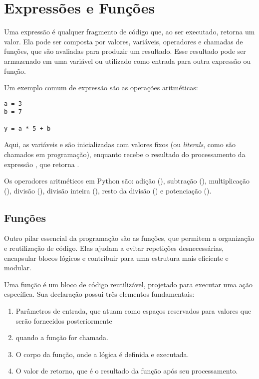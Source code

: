 \chapter{Expressões e Funções}

Uma expressão é qualquer fragmento de código que, ao ser executado, retorna um valor.
Ela pode ser composta por valores, variáveis, operadores e chamadas de funções, que são avaliadas para produzir um
resultado.
Esse resultado pode ser armazenado em uma variável ou utilizado como entrada para outra expressão ou função.



Um exemplo comum de expressão são as operações aritméticas:
\begin{verbatim}
a = 3
b = 7

y = a * 5 + b
\end{verbatim}

Aqui, as variáveis  e  são inicializadas com valores fixos (ou \emph{literals}, como são
chamados em programação), enquanto 
recebe o resultado do processamento da expressão , que retorna .

Os operadores aritméticos em Python são:
adição (\inlcode{+}),
subtração (\inlcode{-}),
multiplicação (\inlcode{*}),
divisão (\inlcode{/}),
divisão inteira (\inlcode{//}),
resto da divisão (\inlcode{\%}) e
potenciação (\inlcode{**}).



\section{Funções}

Outro pilar essencial da programação são as funções, que permitem a organização e reutilização de código.
Elas ajudam a evitar repetições desnecessárias, encapsular blocos lógicos e contribuir para uma estrutura mais
eficiente e modular.

Uma função é um bloco de código reutilizável, projetado para executar uma ação específica.
Sua declaração possui três elementos fundamentais:
\begin{enumerate}
\item Parâmetros de entrada, que atuam como espaços reservados para valores que serão fornecidos posteriormente
\item quando a função for chamada.
\item O corpo da função, onde a lógica é definida e executada.
\item O valor de retorno, que é o resultado da função após seu processamento.
\end{enumerate}

